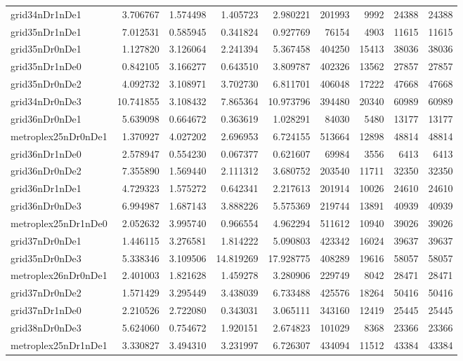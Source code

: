 \begin{longtable}{|l|r|r|r|r|r|r|r|r|}
grid34nDr1nDe1 & 3.706767 & 1.574498 & 1.405723 & 2.980221 & 201993 & 9992 & 24388 & 24388 \\
grid35nDr1nDe1 & 7.012531 & 0.585945 & 0.341824 & 0.927769 & 76154 & 4903 & 11615 & 11615 \\
grid35nDr0nDe1 & 1.127820 & 3.126064 & 2.241394 & 5.367458 & 404250 & 15413 & 38036 & 38036 \\
grid35nDr1nDe0 & 0.842105 & 3.166277 & 0.643510 & 3.809787 & 402326 & 13562 & 27857 & 27857 \\
grid35nDr0nDe2 & 4.092732 & 3.108971 & 3.702730 & 6.811701 & 406048 & 17222 & 47668 & 47668 \\
grid34nDr0nDe3 & 10.741855 & 3.108432 & 7.865364 & 10.973796 & 394480 & 20340 & 60989 & 60989 \\
grid36nDr0nDe1 & 5.639098 & 0.664672 & 0.363619 & 1.028291 & 84030 & 5480 & 13177 & 13177 \\
metroplex25nDr0nDe1 & 1.370927 & 4.027202 & 2.696953 & 6.724155 & 513664 & 12898 & 48814 & 48814 \\
grid36nDr1nDe0 & 2.578947 & 0.554230 & 0.067377 & 0.621607 & 69984 & 3556 & 6413 & 6413 \\
grid36nDr0nDe2 & 7.355890 & 1.569440 & 2.111312 & 3.680752 & 203540 & 11711 & 32350 & 32350 \\
grid36nDr1nDe1 & 4.729323 & 1.575272 & 0.642341 & 2.217613 & 201914 & 10026 & 24610 & 24610 \\
grid36nDr0nDe3 & 6.994987 & 1.687143 & 3.888226 & 5.575369 & 219744 & 13891 & 40939 & 40939 \\
metroplex25nDr1nDe0 & 2.052632 & 3.995740 & 0.966554 & 4.962294 & 511612 & 10940 & 39026 & 39026 \\
grid37nDr0nDe1 & 1.446115 & 3.276581 & 1.814222 & 5.090803 & 423342 & 16024 & 39637 & 39637 \\
grid35nDr0nDe3 & 5.338346 & 3.109506 & 14.819269 & 17.928775 & 408289 & 19616 & 58057 & 58057 \\
metroplex26nDr0nDe1 & 2.401003 & 1.821628 & 1.459278 & 3.280906 & 229749 & 8042 & 28471 & 28471 \\
grid37nDr0nDe2 & 1.571429 & 3.295449 & 3.438039 & 6.733488 & 425576 & 18264 & 50416 & 50416 \\
grid37nDr1nDe0 & 2.210526 & 2.722080 & 0.343031 & 3.065111 & 343160 & 12419 & 25445 & 25445 \\
grid38nDr0nDe3 & 5.624060 & 0.754672 & 1.920151 & 2.674823 & 101029 & 8368 & 23366 & 23366 \\
metroplex25nDr1nDe1 & 3.330827 & 3.494310 & 3.231997 & 6.726307 & 434094 & 11512 & 43384 & 43384 \\

\end{longtable}
